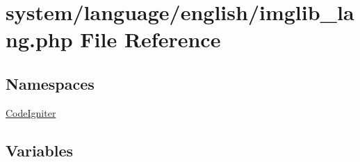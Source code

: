 \hypertarget{imglib__lang_8php}{}\section{system/language/english/imglib\+\_\+lang.php File Reference}
\label{imglib__lang_8php}
\subsection*{Namespaces}
\begin{DoxyCompactItemize}
\item 
 \mbox{\hyperlink{namespace_code_igniter}{Code\+Igniter}}
\end{DoxyCompactItemize}
\subsection*{Variables}
